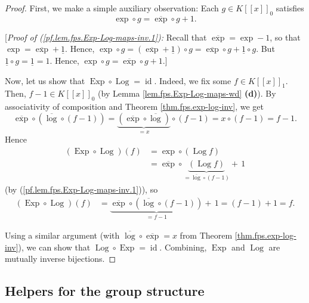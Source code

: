 \begin{proof}
\leanok
First, we make a simple
auxiliary observation: Each $g\in K\left[\left[x\right]\right]_{0}$
satisfies
\begin{equation}
\exp\circ g=\overline{\exp}\circ g+1. \label{pf.lem.fps.Exp-Log-maps-inv.1}
\end{equation}

[\textit{Proof of (\ref{pf.lem.fps.Exp-Log-maps-inv.1}):} Recall that $\overline{\exp}=\exp-1$, so
that $\exp=\overline{\exp}+\underline{1}$. Hence,
$\exp\circ g=\left(\overline{\exp}+\underline{1}\right)\circ g=\overline
{\exp}\circ g+\underline{1}\circ g$. But
$\underline{1}\circ g=\underline{1}=1$. Hence, $\exp\circ g=\overline{\exp
}\circ g+1$.]

Now, let us show that $\operatorname{Exp}\circ\operatorname{Log}
=\operatorname{id}$. Indeed, we fix some $f\in K\left[\left[x\right]
\right]_{1}$. Then, $f-1\in K\left[\left[x\right]\right]_{0}$ (by
Lemma \ref{lem.fps.Exp-Log-maps-wd} \textbf{(d)}). By associativity of composition and Theorem \ref{thm.fps.exp-log-inv}, we get
\[
\overline{\exp}\circ\left(\overline{\log}\circ\left(f-1\right)\right)
=\underbrace{\left(\overline{\exp}\circ\overline{\log}\right)
}_{=x}\circ\left(f-1\right)=x\circ\left(f-1\right)
=f-1.
\]
Hence
\begin{align*}
\left(\operatorname{Exp}\circ\operatorname{Log}\right)\left(f\right)
&  =\exp\circ\left(\operatorname{Log}f\right) \\
&  =\overline{\exp}\circ\underbrace{\left(\operatorname{Log}f\right)
}_{=\overline{\log}\circ\left(f-1\right)}+\,1
\end{align*}
(by (\ref{pf.lem.fps.Exp-Log-maps-inv.1})), so
\begin{align*}
\left(\operatorname{Exp}\circ\operatorname{Log}\right)\left(f\right)
&  =\underbrace{\overline{\exp}\circ\left(\overline{\log}\circ\left(
f-1\right)\right)}_{=f-1}+\,1
=\left(f-1\right)+1=f.
\end{align*}

Using a similar argument (with $\overline{\log}\circ\overline{\exp}=x$ from Theorem \ref{thm.fps.exp-log-inv}), we can show that $\operatorname{Log}\circ
\operatorname{Exp}=\operatorname{id}$.
Combining, $\operatorname{Exp}$ and
$\operatorname{Log}$ are mutually inverse bijections.
\end{proof}

\subsection{Helpers for the group structure}

